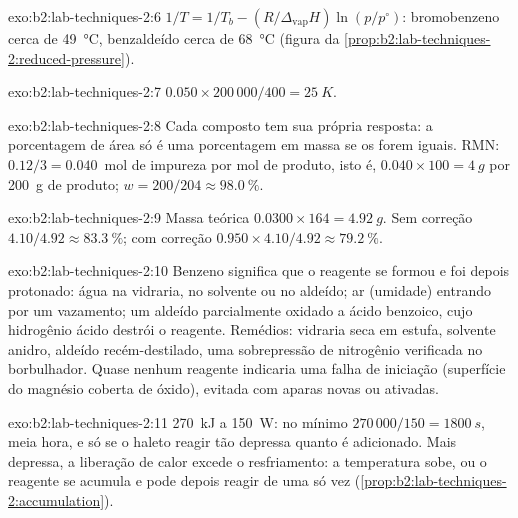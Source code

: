 \begin{solution}{exo:b2:lab-techniques-2:6}
$1/T = 1/T_b - (R/\Delta_{\mathrm{vap}}H)\ln(p/p^\circ)$: bromobenzeno cerca de \qty{49}{\degreeCelsius},
benzaldeído cerca de \qty{68}{\degreeCelsius} (figura da \cref{prop:b2:lab-techniques-2:reduced-pressure}).
\end{solution}

\begin{solution}{exo:b2:lab-techniques-2:7}
$0.050 \times 200\,000/400 = \qty{25}{K}$.
\end{solution}

\begin{solution}{exo:b2:lab-techniques-2:8}
Cada composto tem sua própria resposta: a porcentagem de área só é uma porcentagem em massa se os  forem iguais. RMN: $0.12/3 = 0.040$~mol de impureza por mol de produto, isto é, $0.040 \times 100 = \qty{4}{g}$
por \qty{200}{g} de produto; $w = 200/204 \approx 98.0~\%$.
\end{solution}

\begin{solution}{exo:b2:lab-techniques-2:9}
Massa teórica $0.0300 \times 164 = \qty{4.92}{g}$. Sem correção $4.10/4.92 \approx 83.3~\%$; com correção
$0.950 \times 4.10/4.92 \approx 79.2~\%$.
\end{solution}

\begin{solution}{exo:b2:lab-techniques-2:10}
Benzeno significa que o reagente se formou e foi depois protonado: água na vidraria, no solvente ou no
aldeído; ar (umidade) entrando por um vazamento; um aldeído parcialmente oxidado a ácido benzoico, cujo
hidrogênio ácido destrói o reagente. Remédios: vidraria seca em estufa, solvente anidro, aldeído recém-destilado, uma sobrepressão de nitrogênio verificada no borbulhador. Quase nenhum reagente indicaria
uma falha de iniciação (superfície do magnésio coberta de óxido), evitada com aparas novas ou ativadas.
\end{solution}

\begin{solution}{exo:b2:lab-techniques-2:11}
\qty{270}{kJ} a \qty{150}{W}: no mínimo $270\,000/150 = \qty{1800}{s}$, meia hora, e só se o haleto
reagir tão depressa quanto é adicionado. Mais depressa, a liberação de calor excede o resfriamento: a
temperatura sobe, ou o reagente se acumula e pode depois reagir de uma só vez
(\cref{prop:b2:lab-techniques-2:accumulation}).
\end{solution}

